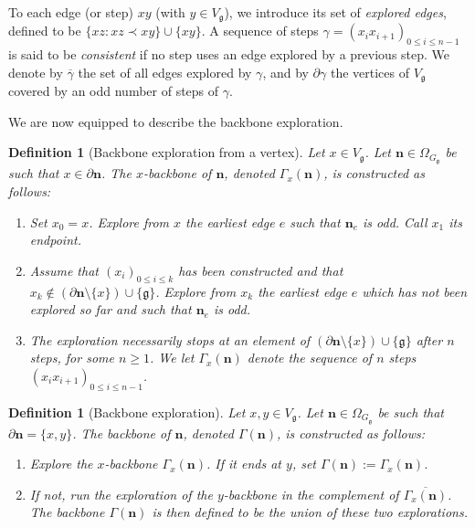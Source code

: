 \documentclass[10pt,a4paper]{amsart}
\numberwithin{equation}{section}
\newtheorem{Def}[Thm]{Definition}
\newcommand\n{\mathbf{n}}
\newcommand\sn{\partial\mathbf{n}}
\newcommand\fg{\mathfrak{g}}
\begin{document}
 To each edge (or step) $xy$ (with $y\in V_\fg$), we introduce its set of \emph{explored edges}, defined to be $\{xz: xz\prec xy\}\cup \{xy\}$. A sequence of steps $\gamma=(x_ix_{i+1})_{0\leq i\leq n-1}$ is said to be \emph{consistent} if no step uses an edge explored by a previous step. We denote by $\overline{\gamma}$ the set of all edges explored by $\gamma$, and by $\partial \gamma$ the vertices of $V_\fg$ covered by an odd number of steps of $\gamma$. 

We are now equipped to describe the backbone exploration.

\begin{Def}[Backbone exploration from a vertex] Let $x\in V_\fg$. Let $\n\in \Omega_{G_{\fg}}$ be such that $x\in \sn$. The $x$-backbone of $\n$, denoted $\Gamma_x(\n)$, is constructed as follows:
\begin{enumerate}
	\item[$(i)$] Set $x_0=x$. Explore from $x$ the earliest edge $e$ such that $\n_e$ is odd. Call $x_1$ its endpoint.
	 \item[$(ii)$] Assume that $(x_i)_{0\leq i\leq k}$ has been constructed and that $x_k\notin(\sn\setminus\{x\})\cup\{\fg\}$. Explore from $x_k$ the earliest edge $e$ which has not been explored so far and such that $\n_e$ is odd.
	 \item[$(iii)$] The exploration necessarily stops at an element of $(\sn\setminus\{x\})\cup\{\fg\}$ after $n$ steps, for some $n\geq 1$. We let $\Gamma_x(\n)$ denote the sequence of $n$ steps $(x_ix_{i+1})_{0\leq i \leq n-1}$.
		\end{enumerate}
		\end{Def}

	\begin{Def}[Backbone exploration] Let $x,y\in V_\fg$. Let $\n\in \Omega_{G_\fg}$ be such that $\sn=\{x,y\}$. The backbone of $\n$, denoted $\Gamma(\n)$, is constructed as follows:
	\begin{enumerate}
		\item[$(i)$] Explore the $x$-backbone $\Gamma_x(\n)$. If it ends at $y$, set $\Gamma(\n):=\Gamma_x(\n)$.
		\item[$(ii)$] If not, run the exploration of the $y$-backbone in the complement of $\overline{\Gamma_x(\n)}$. The backbone $\Gamma(\n)$ is then defined to be the union of these two explorations.
	\end{enumerate}
	\end{Def}
\end{document}
